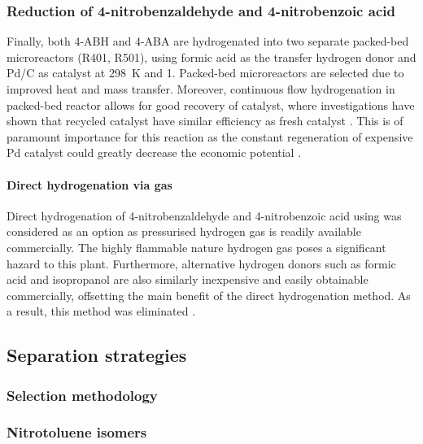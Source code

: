\subsubsection{Reduction of 4-nitrobenzaldehyde and 4-nitrobenzoic acid}

Finally, both 4-ABH and 4-ABA are hydrogenated into two separate packed-bed microreactors (R401, R501), using formic acid as the transfer hydrogen donor and Pd/C as catalyst at \SI{298}{\K} and \SI{1}{\atm}. Packed-bed microreactors are selected due to improved heat and mass transfer. Moreover, continuous flow hydrogenation in packed-bed reactor allows for good recovery of catalyst, where investigations have shown that recycled catalyst have similar efficiency as fresh catalyst \cite{rahman_fast_2020}. This is of paramount importance for this reaction as the constant regeneration of expensive Pd catalyst could greatly decrease the economic potential \cite{rahman_fast_2020}. 


\paragraph{Direct hydrogenation via  gas}

Direct hydrogenation of 4-nitrobenzaldehyde and 4-nitrobenzoic acid using  was considered as an option as pressurised hydrogen gas is readily available commercially. The highly flammable nature hydrogen gas poses a significant hazard to this plant. Furthermore, alternative hydrogen donors such as formic acid and isopropanol are also similarly inexpensive and easily obtainable commercially, offsetting the main benefit of the direct hydrogenation method. As a result, this method was eliminated \cite{wang_golden_nodate}. 






\subsection{Separation strategies}

\subsubsection{Selection methodology}

\subsubsection{Nitrotoluene isomers}

